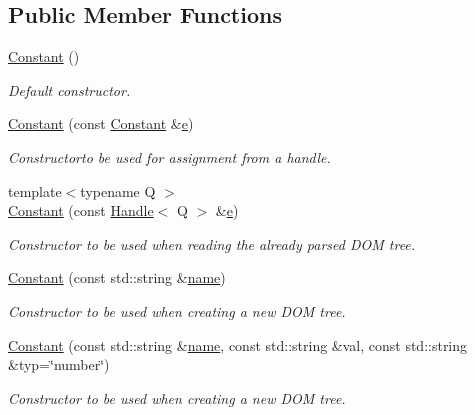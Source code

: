 \subsection*{Public Member Functions}
\begin{DoxyCompactItemize}
\item 
\hyperlink{class_d_d4hep_1_1_geometry_1_1_constant_a4f9e9cc06e1b01401343b855a8c03b9a}{Constant} ()
\begin{DoxyCompactList}\small\item\em Default constructor. \end{DoxyCompactList}\item 
\hyperlink{class_d_d4hep_1_1_geometry_1_1_constant_af3b65056d896ad0554a58d9160c3d358}{Constant} (const \hyperlink{class_d_d4hep_1_1_geometry_1_1_constant}{Constant} \&\hyperlink{_volumes_8cpp_a8a9a1f93e9b09afccaec215310e64142}{e})
\begin{DoxyCompactList}\small\item\em Constructorto be used for assignment from a handle. \end{DoxyCompactList}\item 
{\footnotesize template$<$typename Q $>$ }\\\hyperlink{class_d_d4hep_1_1_geometry_1_1_constant_a0d9d4b37680918009852bf4be0405cf7}{Constant} (const \hyperlink{class_d_d4hep_1_1_handle}{Handle}$<$ Q $>$ \&\hyperlink{_volumes_8cpp_a8a9a1f93e9b09afccaec215310e64142}{e})
\begin{DoxyCompactList}\small\item\em Constructor to be used when reading the already parsed D\+OM tree. \end{DoxyCompactList}\item 
\hyperlink{class_d_d4hep_1_1_geometry_1_1_constant_acf39c0015ad7cf2450ec1a10231bf18c}{Constant} (const std\+::string \&\hyperlink{class_d_d4hep_1_1_handle_a27c7d467a609ab32c133e1f3c7d85ef5}{name})
\begin{DoxyCompactList}\small\item\em Constructor to be used when creating a new D\+OM tree. \end{DoxyCompactList}\item 
\hyperlink{class_d_d4hep_1_1_geometry_1_1_constant_a0c0955ed3f56774ad3fc3fde0d1f1c35}{Constant} (const std\+::string \&\hyperlink{class_d_d4hep_1_1_handle_a27c7d467a609ab32c133e1f3c7d85ef5}{name}, const std\+::string \&val, const std\+::string \&typ=\char`\"{}number\char`\"{})
\begin{DoxyCompactList}\small\item\em Constructor to be used when creating a new D\+OM tree. \end{DoxyCompactList}\item 

\end{DoxyCompactItemize}
